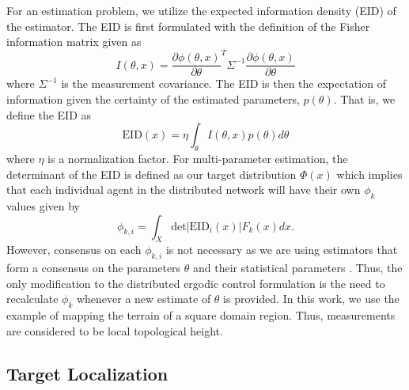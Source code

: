 \documentclass[letterpaper, 10 pt,  conference, twoside]{IEEEtran/IEEEtran}
\theoremstyle{definition}
\begin{document}
For an estimation problem, we utilize the expected information density (EID) of the estimator. The EID is first formulated with the definition of the Fisher information matrix given as
\begin{equation}
I(\theta, x) = \frac{\partial \phi(\theta, x)}{ \partial \theta} ^T \Sigma^{-1} \frac{\partial \phi(\theta, x)}{ \partial \theta}
\end{equation}
where $\Sigma^{-1}$ is the measurement covariance. The EID is then the expectation of information given the certainty of the estimated parameters, $p(\theta)$. That is, we define the EID as
\begin{equation}
\text{EID}(x) = \eta \int_\theta I(\theta, x) p(\theta) d\theta
\end{equation}
where $\eta$ is a normalization factor. For multi-parameter estimation, the determinant of the EID is defined as our target distribution $\Phi(x)$ which implies that each individual agent in the distributed network will have their own $\phi_k$ values given by
\begin{equation}
\phi_{k,i} = \int_X \text{det}\vert \text{EID}_i(x)\vert F_k(x) dx.
\end{equation}
However, consensus on each $\phi_{k,i}$ is not necessary as we are using estimators that form a consensus on the parameters $\theta$ and their statistical parameters \cite{carli2008distributed}. Thus, the only modification to the distributed ergodic control formulation is the need to recalculate $\phi_k$ whenever a new estimate of $\theta$ is provided. In this work, we use the example of mapping the terrain of a square domain region. Thus, measurements are considered to be local topological height.

\subsection{Target Localization}
\end{document}
